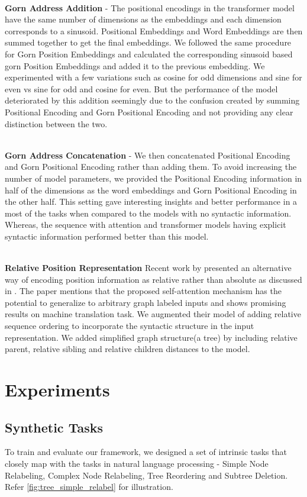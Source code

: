 \documentclass{article}
\begin{document}
\\
\textbf{Gorn Address Addition} - The positional encodings in the transformer model have the same number of dimensions as the embeddings and each dimension corresponds to a sinusoid. Positional Embeddings and Word Embeddings are then summed together to get the final embeddings. We followed the same procedure for Gorn Position Embeddings and calculated the corresponding sinusoid based gorn Position Embeddings and added it to the previous embedding. We experimented with a few variations such as cosine for odd dimensions and sine for even vs sine for odd and cosine for even. But the performance of the model deteriorated by this addition seemingly due to the confusion created by summing Positional Encoding and Gorn Positional Encoding and not providing any clear distinction between the two.

\\
 \textbf{Gorn Address Concatenation} - We then concatenated Positional Encoding and Gorn Positional Encoding rather than adding them. To avoid increasing the number of model parameters, we provided the Positional Encoding information in half of the dimensions as the word embeddings and Gorn Positional Encoding in the other half. This setting gave interesting insights and better performance in a most of the tasks when compared to the models with no syntactic information. Whereas, the sequence with attention and transformer models having explicit syntactic information performed better than this model. 
 
\\
\textbf{Relative Position Representation}
Recent work by \citet{Shaw2018SelfAttentionWR} presented an alternative way of encoding position information as relative rather than absolute as discussed in \citet{Vaswani2017AttentionIA}. The paper mentions that the proposed self-attention mechanism has the potential to generalize to arbitrary graph labeled inputs and shows promising results on machine translation task. We augmented their model of adding relative sequence ordering to incorporate the syntactic structure in the input representation. We added simplified graph structure(a tree) by including relative parent, relative sibling and relative children distances to the model.

\section{Experiments}\label{Experiments}
\subsection{Synthetic Tasks}
To train and evaluate our framework, we designed a set of intrinsic tasks that closely map with the tasks in natural language processing - Simple Node Relabeling, Complex Node Relabeling, Tree Reordering and Subtree Deletion. Refer \autoref{fig:tree_simple_relabel} for illustration. 

\end{document}
